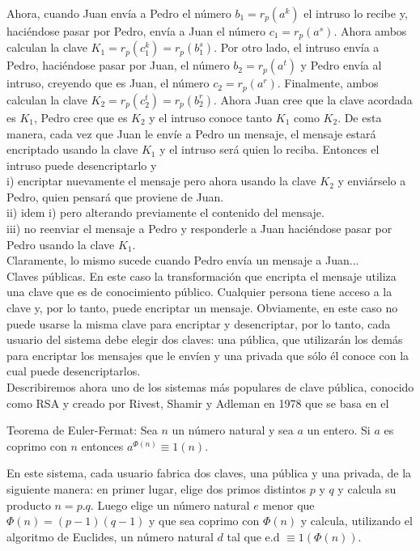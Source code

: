 \documentclass[10pt]{article}
\begin{document}
Ahora, cuando Juan envía a Pedro el número $b_{1}=r_{p}\left(a^{k}\right)$ el intruso lo recibe y, haciéndose pasar por Pedro, envía a Juan el número $c_{1}=r_{p}\left(a^{s}\right)$. Ahora ambos calculan la clave $K_{1}=r_{p}\left(c_{1}^{k}\right)=r_{p}\left(b_{1}^{s}\right)$. Por otro lado, el intruso envía a Pedro, haciéndose pasar por Juan, el número $b_{2}=r_{p}\left(a^{t}\right)$ y Pedro envía al intruso, creyendo que es Juan, el número $c_{2}=r_{p}\left(a^{r}\right)$. Finalmente, ambos calculan la clave $K_{2}=r_{p}\left(c_{2}^{t}\right)=r_{p}\left(b_{2}^{r}\right)$. Ahora Juan cree que la clave acordada es $K_{1}$, Pedro cree que es $K_{2}$ y el intruso conoce tanto $K_{1}$ como $K_{2}$. De esta manera, cada vez que Juan le envíe a Pedro un mensaje, el mensaje estará encriptado usando la clave $K_{1}$ y el intruso será quien lo reciba. Entonces el intruso puede desencriptarlo y\\
i) encriptar nuevamente el mensaje pero ahora usando la clave $K_{2}$ y enviárselo a Pedro, quien pensará que proviene de Juan.\\
ii) idem i) pero alterando previamente el contenido del mensaje.\\
iii) no reenviar el mensaje a Pedro y responderle a Juan haciéndose pasar por Pedro usando la clave $K_{1}$.\\
Claramente, lo mismo sucede cuando Pedro envía un mensaje a Juan...\\
Claves públicas. En este caso la transformación que encripta el mensaje utiliza una clave que es de conocimiento público. Cualquier persona tiene acceso a la clave y, por lo tanto, puede encriptar un mensaje. Obviamente, en este caso no puede usarse la misma clave para encriptar y desencriptar, por lo tanto, cada usuario del sistema debe elegir dos claves: una pública, que utilizarán los demás para encriptar los mensajes que le envíen y una privada que sólo él conoce con la cual puede desencriptarlos.\\
Describiremos ahora uno de los sistemas más populares de clave pública, conocido como RSA y creado por Rivest, Shamir y Adleman en 1978 que se basa en el

Teorema de Euler-Fermat: Sea $n$ un número natural y sea $a$ un entero. Si $a$ es coprimo con $n$ entonces $a^{\Phi(n)} \equiv 1(n)$.

En este sistema, cada usuario fabrica dos claves, una pública y una privada, de la siguiente manera: en primer lugar, elige dos primos distintos $p$ y $q$ y calcula su producto $n=p . q$. Luego elige un número natural $e$ menor que $\Phi(n)=(p-1)(q-1)$ y que sea coprimo con $\Phi(n)$ y calcula, utilizando el algoritmo de Euclides, un número natural $d$ tal que e.d $\equiv 1(\Phi(n))$.
\end{document}
